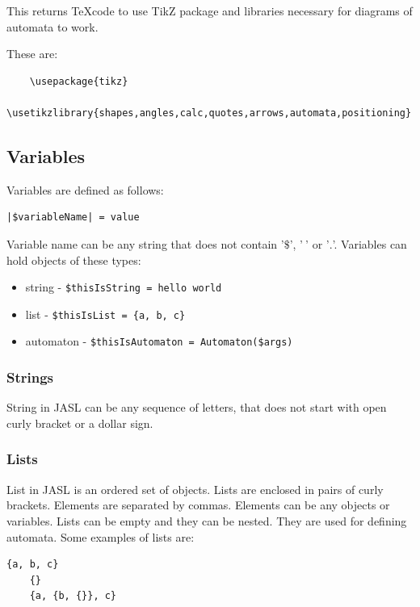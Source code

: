 \documentclass{ctuthesis}
\begin{document}
This returns \TeX code to use TikZ package and libraries necessary for diagrams of automata to work.

These are:
\begin{verbatim}
	\usepackage{tikz}
	\usetikzlibrary{shapes,angles,calc,quotes,arrows,automata,positioning}
\end{verbatim}

\subsection{Variables}
Variables are defined as follows:
\begin{lstlisting}[language = JASL_snippet]
	|$variableName| = value
\end{lstlisting}

Variable name can be any string that does not contain '$\$$', '$\ $' or '$.$'. Variables can hold objects of these types:
\begin{itemize}
	\item string - \verb'$thisIsString = hello world'
	\item list - \verb'$thisIsList = {a, b, c}'
	\item automaton - \verb'$thisIsAutomaton = Automaton($args)'
\end{itemize}

\subsubsection{Strings}
String in JASL can be any sequence of letters, that does not start with open curly bracket or a dollar sign.

\subsubsection{Lists}
List in JASL is an ordered set of objects. Lists are enclosed in pairs of curly brackets. Elements are separated by commas. Elements can be any objects or variables. Lists can be empty and they can be nested. They are used for defining automata. Some examples of lists are:

\begin{minipage}{\linewidth}
\begin{lstlisting}[language = JASL_snippet]
	{a, b, c}
	{}
	{a, {b, {}}, c}
\end{lstlisting}
\end{minipage}
\end{document}
